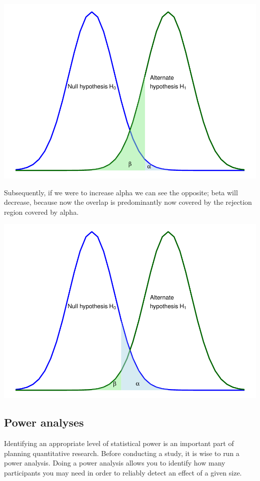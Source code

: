 \documentclass[
]{book}
\begin{document}
\includegraphics{_main_files/figure-latex/unnamed-chunk-84-1.pdf}

Subsequently, if we were to increase alpha we can see the opposite; beta will decrease, because now the overlap is predominantly now covered by the rejection region covered by alpha.

\includegraphics{_main_files/figure-latex/unnamed-chunk-85-1.pdf}

\hypertarget{power-analyses}{%
\subsection{Power analyses}\label{power-analyses}}

Identifying an appropriate level of statistical power is an important part of planning quantitative research. Before conducting a study, it is wise to run a power analysis. Doing a power analysis allows you to identify how many participants you may need in order to reliably detect an effect of a given size.
\end{document}
